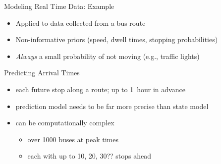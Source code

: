 \documentclass[10pt,t]{beamer}
\begin{document}
\begin{frame}{Modeling Real Time Data: Example}
  \begin{itemize}
    \item Applied to data collected from a bus route
    \item Non-informative priors (speed, dwell times, stopping probabilities)
    \item \emph{Always} a small probability of not moving (e.g., traffic lights)
  \end{itemize}
\end{frame}

{ %
    \begin{frame}[plain]
     \end{frame}
}





\begin{frame}{Predicting Arrival Times}
  \onslide<+->

  \begin{itemize}[<+- | alert@+>]
  \item each future stop along a route; up to 1~hour in advance
  \item prediction model needs to be far more precise than state model
  \item can be computationally complex
    \begin{itemize}
    \item over 1000 buses at peak times
    \item each with up to 10, 20, 30?? stops ahead
    \end{itemize}
  \end{itemize}

  \onslide<+->
\end{frame}
\end{document}
